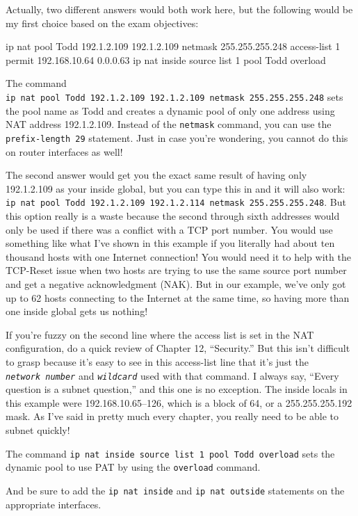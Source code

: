 Actually, two different answers would both work here, but the following
would be my first choice based on the exam objectives:

\begin{cli}
ip nat pool Todd 192.1.2.109 192.1.2.109 netmask 255.255.255.248
access-list 1 permit 192.168.10.64 0.0.0.63
ip nat inside source list 1 pool Todd overload
\end{cli}

The command
\texttt{ip\ nat\ pool\ Todd\ 192.1.2.109\ 192.1.2.109\ netmask\ 255.255.255.248}
sets the pool name as Todd and creates a dynamic pool of only one
address using NAT address 192.1.2.109. Instead of the \texttt{netmask}
command, you can use the \texttt{prefix-length\ 29} statement. Just in
case you're wondering, you cannot do this on router interfaces as well!

The second answer would get you the exact same result of having only
192.1.2.109 as your inside global, but you can type this in and it will
also work:
\texttt{ip\ nat\ pool\ Todd\ 192.1.2.109\ 192.1.2.114\ netmask\ 255.255.255.248}.
But this option really is a waste because the second through sixth
addresses would only be used if there was a conflict with a TCP port
number. You would use something like what I've shown in this example if
you literally had about ten thousand hosts with one Internet connection!
You would need it to help with the TCP-Reset issue when two hosts are
trying to use the same source port number and get a negative
acknowledgment (NAK). But in our example, we've only got up to 62 hosts
connecting to the Internet at the same time, so having more than one
inside global gets us nothing!

If you're fuzzy on the second line where the access list is set in the
NAT configuration, do a quick review of Chapter 12, ``Security.'' But
this isn't difficult to grasp because it's easy to see in this
access-list line that it's just the \emph{\texttt{network\ number}} and
\emph{\texttt{wildcard}} used with that command. I always say, ``Every
question is a subnet question,'' and this one is no exception. The
inside locals in this example were 192.168.10.65--126, which is a block
of 64, or a 255.255.255.192 mask. As I've said in pretty much every
chapter, you really need to be able to subnet quickly!

The command
\texttt{ip\ nat\ inside\ source\ list\ 1\ pool\ Todd\ overload} sets the
dynamic pool to use PAT by using the \texttt{overload} command.

And be sure to add the \texttt{ip\ nat\ inside} and
\texttt{ip\ nat\ outside} statements on the appropriate interfaces.

